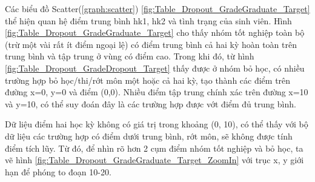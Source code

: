     \FloatBarrier

    Các biểu đồ Scatter(\ref{graph:scatter}) \ref{fig:Table_Dropout_GradeGraduate_Target} thể hiện quan hệ điểm trung bình hk1, hk2 và tình trạng của sinh viên. Hình \ref{fig:Table_Dropout_GradeGraduate_Target} cho thấy nhóm tốt nghiệp toàn bộ (trừ một vài rất ít điểm ngoại lệ) có điểm trung bình cả hai kỳ hoàn toàn trên trung bình và tập trung ở vùng có điểm cao. Trong khi đó, từ hình \ref{fig:Table_Dropout_GradeDropout_Target} thấy được ở nhóm bỏ học, có nhiều trường hợp bỏ học/thi/rớt môn một hoặc cả hai kỳ, tạo thành các điểm trên đường x=0, y=0 và điểm (0,0). Nhiều điểm tập trung chính xác trên đường x=10 và y=10, có thể suy đoán đây là các trường hợp được vớt điểm đủ trung bình.

    Dữ liệu điểm hai học kỳ không có giá trị trong khoảng (0, 10), có thể thấy với bộ dữ liệu các trường hợp có điểm dưới trung bình, rớt môn, sẽ không được tính điểm tích lũy. Từ đó, để nhìn rõ hơn 2 cụm điểm nhóm tốt nghiệp và bỏ học, ta vẽ hình \ref{fig:Table_Dropout_GradeGraduate_Target_ZoomIn} với trục x, y giới hạn để phóng to đoạn 10-20.

